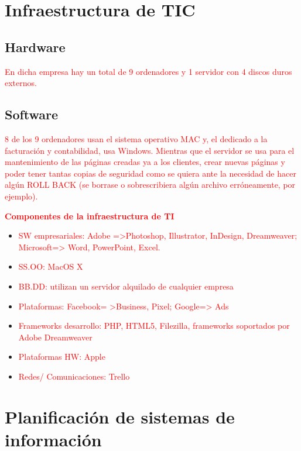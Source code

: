 \documentclass{article}
\begin{document}
\section{Infraestructura de TIC}

\subsection{Hardware}

\textcolor{Red}{En dicha empresa hay un total de 9 ordenadores y 1 servidor con 4 discos duros externos.}

\subsection{Software}

\textcolor{Red}{8 de los 9 ordenadores usan el sistema operativo MAC y, el dedicado a la facturación y contabilidad, usa Windows. Mientras que el servidor se usa para el mantenimiento de las páginas creadas ya a los clientes, crear nuevas páginas y poder tener tantas copias de seguridad como se quiera ante la necesidad de hacer algún ROLL BACK (se borrase o sobrescribiera algún archivo erróneamente, por ejemplo).}

\textcolor{Red}{\textbf{Componentes de la infraestructura de TI}} 

\begin{itemize}
\item \textcolor{Red}{SW empresariales: Adobe =>Photoshop, Illustrator, InDesign, Dreamweaver; Microsoft=> Word, PowerPoint, Excel.}
\item \textcolor{Red}{SS.OO: MacOS X}
\item \textcolor{Red}{BB.DD: utilizan un servidor alquilado de cualquier empresa}
\item \textcolor{Red}{Plataformas: Facebook= >Business, Pixel; Google=> Ads}
\item \textcolor{Red}{Frameworks desarrollo: PHP, HTML5, Filezilla, frameworks soportados por Adobe Dreamweaver}
\item \textcolor{Red}{Plataformas HW: Apple}
\item \textcolor{Red}{Redes/ Comunicaciones: Trello}
\end{itemize}  

\section{Planificación de sistemas de información}
\end{document}

